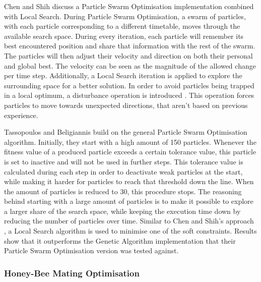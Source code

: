 Chen and Shih \cite{Chen2013} discuss a Particle Swarm Optimisation implementation combined with Local Search. During Particle Swarm Optimisation, a swarm of particles, with each particle corresponding to a different timetable, moves through the available search space. During every iteration, each particle will remember its best encountered position and share that information with the rest of the swarm. The particles will then adjust their velocity and direction on both their personal and global best. The velocity can be seen as the magnitude of the allowed change per time step. Additionally, a Local Search iteration is applied to explore the surrounding space for a better solution. In order to avoid particles being trapped in a local optimum, a disturbance operation is introduced \cite{tsai2010}. This operation forces particles to move towards unexpected directions, that aren't based on previous experience. 

Tassopoulos and Beligiannis \cite{Tassopoulos2012} build on the general Particle Swarm Optimisation algorithm. Initially, they start with a high amount of 150 particles. Whenever the fitness value of a produced particle exceeds a certain tolerance value, this particle is set to inactive and will not be used in further steps. This tolerance value is calculated during each step in order to deactivate weak particles at the start, while making it harder for particles to reach that threshold down the line. When the amount of particles is reduced to 30, this procedure stops. The reasoning behind starting with a large amount of particles is to make it possible to explore a larger share of the search space, while keeping the execution time down by reducing the number of particles over time. Similar to Chen and Shih's approach \cite{Chen2013}, a Local Search algorithm is used to minimise one of the soft constraints. Results show that it outperforms the Genetic Algorithm implementation that their Particle Swarm Optimisation version was tested against.
\subsubsection{Honey-Bee Mating Optimisation}

